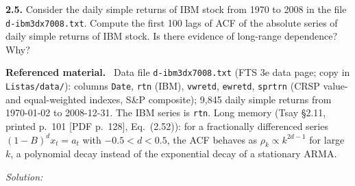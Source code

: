 \documentclass[11pt,a4paper]{article}
\newif\ifsolucoes
\newcommand{\espacoresol}{4.5cm}   %
\newenvironment{refmat}{\par\smallskip\noindent\begin{minipage}{\linewidth}\small\textbf{Referenced material.}~}{\end{minipage}\par\smallskip}
\newcommand{\resolespaco}{\ifsolucoes\else\par\textit{Solution:}\vspace{\espacoresol}\par\fi}
\begin{document}
\noindent\textbf{2.5.} Consider the daily simple returns of IBM stock from 1970 to 2008 in the file
\texttt{d-ibm3dx7008.txt}. Compute the first 100 lags of ACF of the absolute series of daily simple returns of
IBM stock. Is there evidence of long-range dependence? Why?
\begin{refmat}
Data file \texttt{d-ibm3dx7008.txt} (FTS 3e data page; copy in \texttt{Listas/data/}): columns
\texttt{Date}, \texttt{rtn} (IBM), \texttt{vwretd}, \texttt{ewretd}, \texttt{sprtrn} (CRSP value- and
equal-weighted indexes, S\&P composite); 9,845 daily simple returns from 1970-01-02 to 2008-12-31. The IBM
series is \texttt{rtn}. Long memory (Tsay \S2.11, printed p.~101 [PDF p.~128], Eq.~(2.52)): for a
fractionally differenced series $(1-B)^dx_t=a_t$ with $-0.5<d<0.5$, the ACF behaves as $\rho_k\propto k^{2d-1}$
for large $k$, a polynomial decay instead of the exponential decay of a stationary ARMA.
\end{refmat}
\resolespaco
\end{document}
